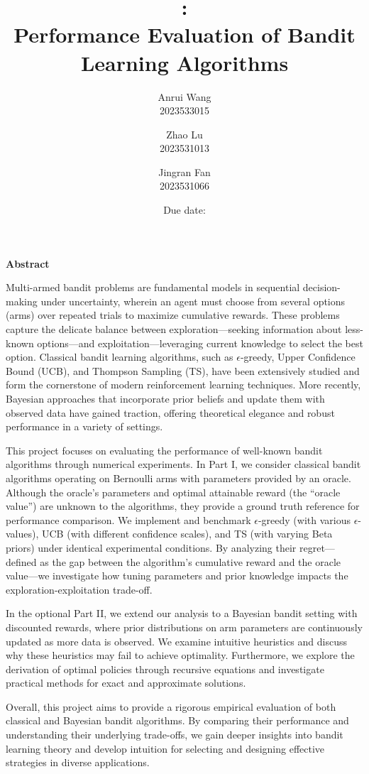 \documentclass[11pt]{article}
\title{
    \vspace{100pt}
    \bigskip
    \textbf{\CourseName:} \\
    \textbf{Performance Evaluation of Bandit Learning Algorithms} \\
    \bigskip
}
\author{
    Anrui Wang \\ 2023533015 \\
    \and
    Zhao Lu \\ 2023531013 \\
    \and
    Jingran Fan \\ 2023531066
}
\date{Due date: \DueDate}
\renewenvironment{abstract}
  {\begin{center}\bfseries\Large Abstract\vspace{1em}\end{center}%
   \normalsize} %
  {}
\begin{document}
\setlength{\parindent}{2em}

\maketitle

\newpage

\begin{abstract}

Multi-armed bandit problems are fundamental models in sequential decision-making under uncertainty, wherein an agent must choose from several options (arms) over repeated trials to maximize cumulative rewards. These problems capture the delicate balance between exploration—seeking information about less-known options—and exploitation—leveraging current knowledge to select the best option. Classical bandit learning algorithms, such as 
$\epsilon$-greedy, Upper Confidence Bound (UCB), and Thompson Sampling (TS), have been extensively studied and form the cornerstone of modern reinforcement learning techniques. More recently, Bayesian approaches that incorporate prior beliefs and update them with observed data have gained traction, offering theoretical elegance and robust performance in a variety of settings.

This project focuses on evaluating the performance of well-known bandit algorithms through numerical experiments. In Part I, we consider classical bandit algorithms operating on Bernoulli arms with parameters provided by an oracle. Although the oracle’s parameters and optimal attainable reward (the “oracle value”) are unknown to the algorithms, they provide a ground truth reference for performance comparison. We implement and benchmark 
$\epsilon$-greedy (with various $\epsilon$-values), UCB (with different confidence scales), and TS (with varying Beta priors) under identical experimental conditions. By analyzing their regret—defined as the gap between the algorithm’s cumulative reward and the oracle value—we investigate how tuning parameters and prior knowledge impacts the exploration-exploitation trade-off.

In the optional Part II, we extend our analysis to a Bayesian bandit setting with discounted rewards, where prior distributions on arm parameters are continuously updated as more data is observed. We examine intuitive heuristics and discuss why these heuristics may fail to achieve optimality. Furthermore, we explore the derivation of optimal policies through recursive equations and investigate practical methods for exact and approximate solutions.

Overall, this project aims to provide a rigorous empirical evaluation of both classical and Bayesian bandit algorithms. By comparing their performance and understanding their underlying trade-offs, we gain deeper insights into bandit learning theory and develop intuition for selecting and designing effective strategies in diverse applications.
\end{abstract}
\end{document}
